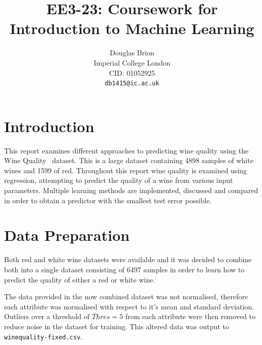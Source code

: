 \documentclass[10pt,twocolumn,letterpaper]{article}
\begin{document}
\title{EE3-23: Coursework for Introduction to Machine Learning}

\author{Douglas Brion\\
Imperial College London\\
CID: 01052925\\
{\tt\small db1415@ic.ac.uk}
}

\maketitle


\section{Introduction}

This report examines different approaches to predicting wine quality using the Wine Quality~\cite{WineQuality} dataset. This is a large dataset containing 4898 samples of white wines and 1599 of red. Throughout this report wine quality is examined using regression, attempting to predict the quality of a wine from various input parameters. Multiple learning methods are implemented, discussed and compared in order to obtain a predictor with the smallest test error possible.

\section{Data Preparation}
Both red and white wine datasets were available and it was decided to combine both into a single dataset consisting of 6497 samples in order to learn how to predict the quality of either a red or white wine. 

The data provided in the now combined dataset was not normalised, therefore each attribute was normalised with respect to it's mean and standard deviation. Outliers over a threshold of $Thres = 5$ from each attribute were then removed to reduce noise in the dataset for training. This altered data was output to 
\verb+winequality-fixed.csv+.
\end{document}
